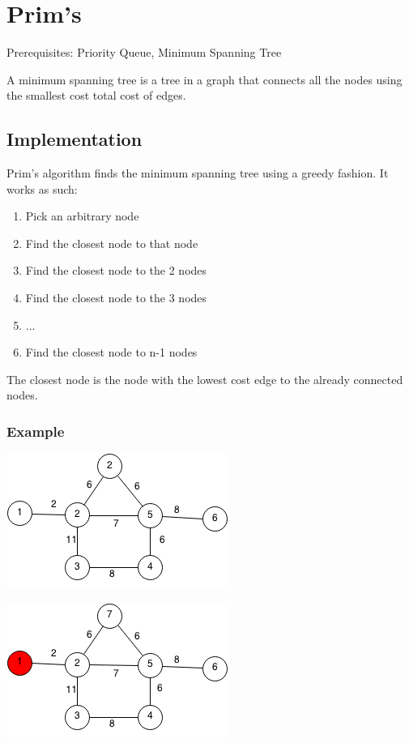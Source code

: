 \documentclass[11pt,oneside]{book}
\makeatletter
\def\maxwidth#1{\ifdim\Gin@nat@width>#1 #1\else\Gin@nat@width\fi}
\makeatother
\begin{document}
        \section{ Prim's }
        Prerequisites:  Priority Queue, Minimum Spanning Tree

A minimum spanning tree is a tree in a graph that connects all the nodes using the smallest cost total cost of edges.

\subsection{Implementation}

Prim's algorithm finds the minimum spanning tree using a greedy fashion. It works as such:

\begin{enumerate}
\item Pick an arbitrary node
\item Find the closest node to that node
\item Find the closest node to the 2 nodes
\item Find the closest node to the 3 nodes
\item ...
\item Find the closest node to n-1 nodes
\end{enumerate}

The closest node is the node with the lowest cost edge to the already connected nodes.

\subsubsection{Example}

\vspace{5px}\includegraphics[width=\maxwidth{\textwidth}]{prim.png}

\vspace{5px}\includegraphics[width=\maxwidth{\textwidth}]{prim1.png}
\end{document}
